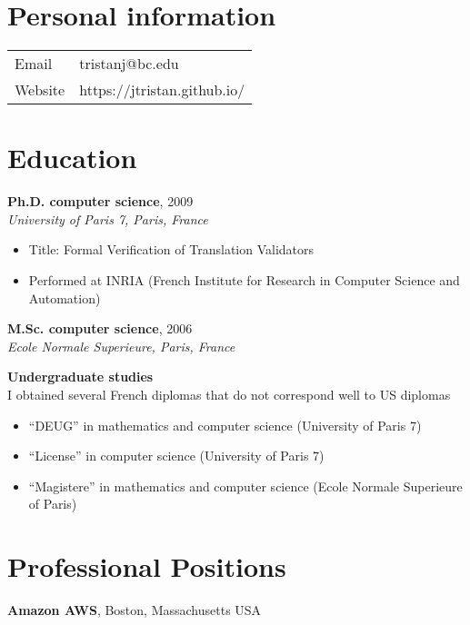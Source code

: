 \documentclass[margin,line]{res}
\begin{document}

\begin{resume}


\section{\sc Personal information}
\vspace{.05in}
\begin{tabular}{@{}p{2in}p{4in}}
  Email           & tristanj@bc.edu \\
  Website         & https://jtristan.github.io/ \\
\end{tabular}

\section{\sc Education}
{\bf Ph.D. computer science}, 2009\\
{\em University of Paris 7, Paris, France} 
\begin{itemize}
  \item Title: Formal Verification of Translation Validators
  \item Performed at INRIA (French Institute for Research in Computer Science and Automation)
\end{itemize}

{\bf M.Sc. computer science}, 2006\\
{\em Ecole Normale Superieure, Paris, France} 

{\bf Undergraduate studies}\\
I obtained several French diplomas that do not correspond well to US diplomas
\begin{itemize}
\item ``DEUG'' in mathematics and computer science (University of Paris 7)
\item ``License'' in computer science (University of Paris 7)
\item ``Magistere'' in mathematics and computer science (Ecole Normale Superieure of Paris)
\end{itemize}

\section{\sc Professional Positions}
{\bf Amazon AWS}, Boston, Massachusetts USA
\vspace{-.4cm}


\end{resume}
\end{document}
